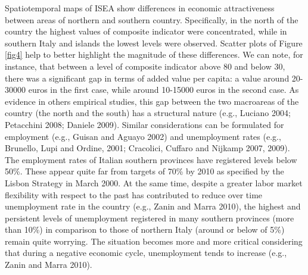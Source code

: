 \documentclass[10pt]{article}
\theoremstyle{definition}
\theoremstyle{plain}
\begin{document}
Spatiotemporal maps of ISEA show differences in economic attractiveness between areas of northern and southern country. Specifically, in the north of the country the highest values of composite indicator were concentrated, while in southern Italy and islands the lowest levels were observed. Scatter plots of Figure \ref{fig4} help to better highlight the magnitude of these differences. We can note, for instance, that between a level of composite indicator above 80 and below 30, there was a significant gap in terms of added value per capita: a value around 20-30000 euros in the first case, while around 10-15000 euros in the second case. As evidence in others empirical studies, this gap between the two macroareas of the country (the north and the south) has a structural nature (e.g., Luciano 2004; Petacchini 2008; Daniele 2009). Similar considerations can be formulated for employment (e.g., Guisan and Aguayo 2002) and unemployment rates (e.g., Brunello, Lupi and Ordine, 2001; Cracolici, Cuffaro and Nijkamp 2007, 2009). The employment rates of Italian southern provinces have registered levels below 50\%. These appear quite far from targets of 70\% by 2010 as specified by the Lisbon Strategy in March 2000. At the same time, despite a greater labor market flexibility with respect to the past has contributed to reduce over time unemployment rate in the country (e.g., Zanin and Marra 2010), the highest and persistent levels of unemployment registered in many southern provinces (more than 10\%) in comparison to those of northern Italy (around or below of 5\%) remain quite worrying. The situation becomes more and more critical considering that during a negative economic cycle, unemployment tends to increase (e.g., Zanin and Marra 2010).
\end{document}

